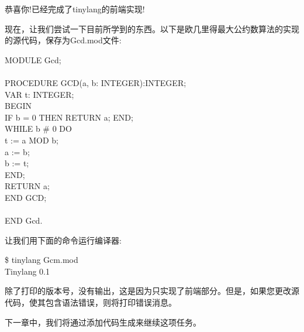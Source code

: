 恭喜你!已经完成了tinylang的前端实现!\par

现在，让我们尝试一下目前所学到的东西。以下是欧几里得最大公约数算法的实现的源代码，保存为Gcd.mod文件:\par

\begin{tcolorbox}[colback=white,colframe=black]
MODULE Gcd; \\
\\
PROCEDURE GCD(a, b: INTEGER):INTEGER; \\
VAR t: INTEGER; \\
BEGIN \\
\hspace*{0.5cm}IF b = 0 THEN RETURN a; END; \\
\hspace*{1cm}WHILE b \# 0 DO \\
\hspace*{1.5cm}t := a MOD b; \\
\hspace*{1.5cm}a := b; \\
\hspace*{1.5cm}b := t; \\
\hspace*{1cm}END; \\
\hspace*{1cm}RETURN a; \\
END GCD; \\
\\
END Gcd.
\end{tcolorbox}

让我们用下面的命令运行编译器:\par

\begin{tcolorbox}[colback=white,colframe=black]
\$ tinylang Gcm.mod \\
Tinylang 0.1
\end{tcolorbox}

除了打印的版本号，没有输出，这是因为只实现了前端部分。但是，如果您更改源代码，使其包含语法错误，则将打印错误消息。\par

下一章中，我们将通过添加代码生成来继续这项任务。\par

















